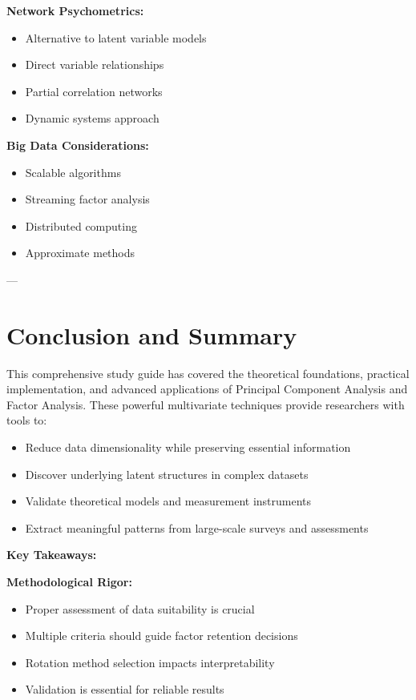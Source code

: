 \documentclass[
]{article}
\begin{document}
\textbf{Network Psychometrics:}

\begin{itemize}
\item
  Alternative to latent variable models
\item
  Direct variable relationships
\item
  Partial correlation networks
\item
  Dynamic systems approach
\end{itemize}

\textbf{Big Data Considerations:}

\begin{itemize}
\item
  Scalable algorithms
\item
  Streaming factor analysis
\item
  Distributed computing
\item
  Approximate methods
\end{itemize}

---

\section{Conclusion and Summary}

This comprehensive study guide has covered the theoretical foundations,
practical implementation, and advanced applications of Principal
Component Analysis and Factor Analysis. These powerful multivariate
techniques provide researchers with tools to:

\begin{itemize}
\item
  Reduce data dimensionality while preserving essential information
\item
  Discover underlying latent structures in complex datasets
\item
  Validate theoretical models and measurement instruments
\item
  Extract meaningful patterns from large-scale surveys and assessments
\end{itemize}

\textbf{Key Takeaways:}

\textbf{Methodological Rigor:}

\begin{itemize}
\item
  Proper assessment of data suitability is crucial
\item
  Multiple criteria should guide factor retention decisions
\item
  Rotation method selection impacts interpretability
\item
  Validation is essential for reliable results
\end{itemize}
\end{document}

